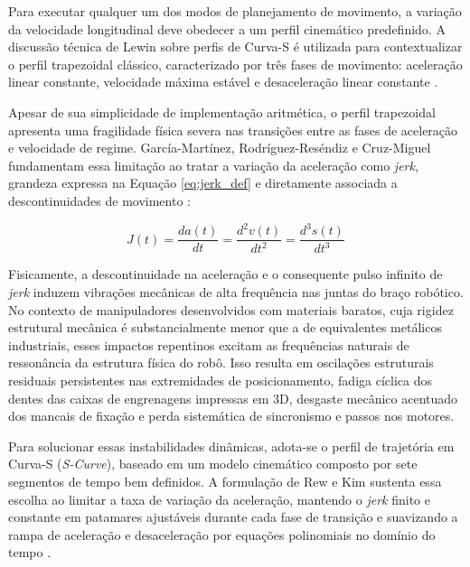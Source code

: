 Para executar qualquer um dos modos de planejamento de movimento, a variação da velocidade longitudinal deve obedecer a um perfil cinemático predefinido. A discussão técnica de Lewin sobre perfis de Curva-S é utilizada para contextualizar o perfil trapezoidal clássico, caracterizado por três fases de movimento: aceleração linear constante, velocidade máxima estável e desaceleração linear constante \cite{lewin2023scurve}.

Apesar de sua simplicidade de implementação aritmética, o perfil trapezoidal apresenta uma fragilidade física severa nas transições entre as fases de aceleração e velocidade de regime. García-Martínez, Rodríguez-Reséndiz e Cruz-Miguel fundamentam essa limitação ao tratar a variação da aceleração como \textit{jerk}, grandeza expressa na Equação \ref{eq:jerk_def} e diretamente associada a descontinuidades de movimento \cite{garcia2019new}:

\begin{equation}
\label{eq:jerk_def}
J(t) = \frac{da(t)}{dt} = \frac{d^2v(t)}{dt^2} = \frac{d^3s(t)}{dt^3}
\end{equation}

Fisicamente, a descontinuidade na aceleração e o consequente pulso infinito de \textit{jerk} induzem vibrações mecânicas de alta frequência nas juntas do braço robótico. No contexto de manipuladores desenvolvidos com materiais baratos, cuja rigidez estrutural mecânica é substancialmente menor que a de equivalentes metálicos industriais, esses impactos repentinos excitam as frequências naturais de ressonância da estrutura física do robô. Isso resulta em oscilações estruturais residuais persistentes nas extremidades de posicionamento, fadiga cíclica dos dentes das caixas de engrenagens impressas em 3D, desgaste mecânico acentuado dos mancais de fixação e perda sistemática de sincronismo e passos nos motores.

Para solucionar essas instabilidades dinâmicas, adota-se o perfil de trajetória em Curva-S (\textit{S-Curve}), baseado em um modelo cinemático composto por sete segmentos de tempo bem definidos. A formulação de Rew e Kim sustenta essa escolha ao limitar a taxa de variação da aceleração, mantendo o \textit{jerk} finito e constante em patamares ajustáveis durante cada fase de transição e suavizando a rampa de aceleração e desaceleração por equações polinomiais no domínio do tempo \cite{rew2021closed}.


